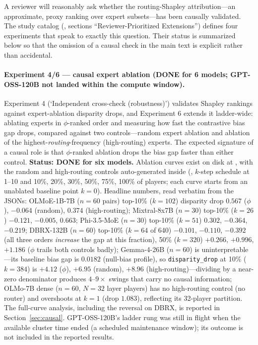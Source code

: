 \documentclass[sigconf]{acmart}
\begin{document}
A reviewer will reasonably ask whether the routing-Shapley attribution---an
approximate, proxy ranking over expert subsets---has been causally validated.
The study catalog (, sections
``Reviewer-Prioritized Extensions'') defines four experiments that speak to
exactly this question. Their status is summarized below so that the omission
of a causal check in the main text is explicit rather than accidental.

\paragraph{Experiment 4/6 --- causal expert ablation (DONE for 6 models;
GPT-OSS-120B not landed within the compute window).}
Experiment 4 (`Independent cross-check (robustness)') validates Shapley
rankings against expert-ablation disparity drops, and Experiment 6 extends it
ladder-wide: ablating experts in $\phi$-ranked order and measuring how fast
the contrastive bias gap drops, compared against two controls---random expert
ablation and ablation of the highest-\emph{routing}-frequency (high-routing)
experts. The expected signature of a causal role is that $\phi$-ranked
ablation drops the bias gap faster than either control.
\textbf{Status: DONE for six models.} Ablation curves exist on disk at
, with the random and high-routing controls
auto-generated inside 
(, $k$-step schedule at 1--10 and 10\%,
20\%, 30\%, 50\%, 75\%, 100\% of players; each curve starts from an
unablated baseline point $k{=}0$). Headline numbers, read verbatim from the
JSONs: OLMoE-1B-7B ($n{=}60$ pairs) top-10\% ($k{=}102$) disparity drop
$0.567$ ($\phi$), $-0.064$ (random), $0.374$ (high-routing); Mixtral-8x7B
($n{=}30$) top-10\% ($k{=}26$) $-0.121$, $-0.005$, $0.663$;
Phi-3.5-MoE ($n{=}30$) top-10\% ($k{=}51$) $0.302$, $-0.364$, $-0.219$;
DBRX-132B ($n{=}60$) top-10\% ($k{=}64$ of 640) $-0.101$, $-0.110$,
$-0.392$ (all three orders \emph{increase} the gap at this fraction),
50\% ($k{=}320$) $+0.266$, $+0.996$, $+1.186$ ($\phi$ trails both
controls badly); Gemma-4-26B ($n{=}60$) is uninterpretable---its
baseline bias gap is $0.0182$ (null-bias profile), so
\texttt{disparity\_drop} at 10\% ($k{=}384$) is $+4.12$ ($\phi$),
$+6.95$ (random), $+8.96$ (high-routing)---dividing by a near-zero
denominator produces $4$--$9\times$ swings that carry no causal
information; OLMo-7B dense ($n{=}60$, $N{=}32$ layer players) has no
high-routing control (no router) and overshoots at $k{=}1$ (drop
$1.083$), reflecting its 32-player partition. The full-curve analysis,
including the reversal on DBRX, is reported in Section~\ref{sec:causal}.
GPT-OSS-120B's ladder rung was still in flight when the available
cluster time ended (a scheduled maintenance window); its outcome is not
included in the reported results.
\end{document}
